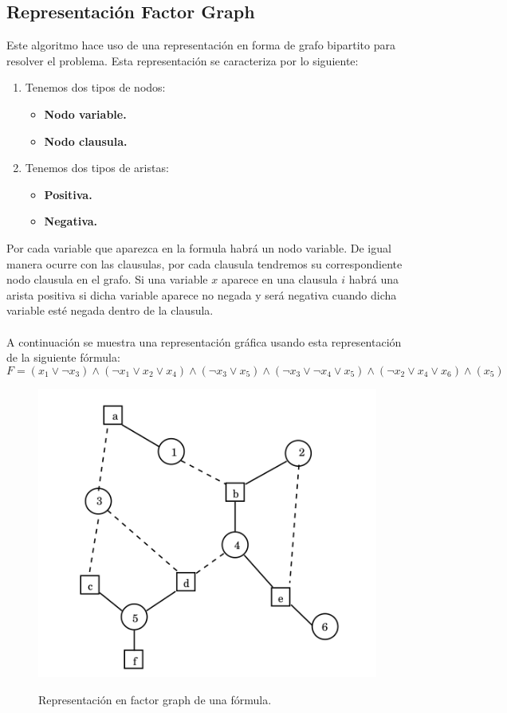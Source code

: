 \subsection{Representación Factor Graph}
Este algoritmo hace uso de una representación en forma de grafo bipartito para resolver el problema. Esta representación se caracteriza por lo siguiente:
\begin{enumerate}
	\item Tenemos dos tipos de nodos:
	\begin{itemize}
		\item \textbf{Nodo variable.}
		\item \textbf{Nodo clausula.}
	\end{itemize}
	\item Tenemos dos tipos de aristas:
	\begin{itemize}
		\item \textbf{Positiva.}
		\item \textbf{Negativa.}
	\end{itemize}
\end{enumerate}
Por cada variable que aparezca en la formula habrá un nodo variable. De igual manera ocurre con las clausulas, por cada clausula tendremos su correspondiente nodo clausula en el grafo. 
Si una variable $x$ aparece en una clausula $i$ habrá una arista positiva si dicha variable aparece no negada y será negativa cuando dicha variable esté negada dentro de la clausula.\\\\
A continuación se muestra una representación gráfica usando esta representación de la siguiente fórmula: \[F = (x_1 \lor\neg x_3) \land (\neg x_1 \lor x_2 \lor x_4) \land (\neg x_3 \lor x_5) \land (\neg x_3 \lor \neg x_4 \lor x_5) \land (\neg x_2 \lor x_4 \lor x_6) \land (x_5)\]
\pagebreak
\begin{figure}[!htbp]
	\centering
	\includegraphics[scale=0.5]{img/fg}
	\label{img:fg1}
	\caption{Representación en factor graph de una fórmula.}
\end{figure}\\
